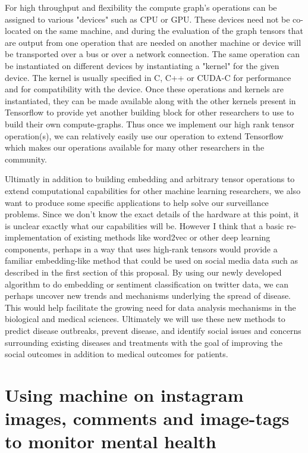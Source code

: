 For high throughput and flexibility the compute graph's operations can be assigned to various "devices" such as CPU or GPU. These devices need not be co-located on the same machine, and during the evaluation of the graph tensors that are output from one operation that are needed on another machine or device will be transported over a bus or over a network connection. The same operation can be instantiated on different devices by instantiating a "kernel" for the given device. The kernel is usually specified in C, C++ or CUDA-C for performance and for compatibility with the device. Once these operations and kernels are instantiated, they can be made available along with the other kernels present in Tensorflow to provide yet another building block for other researchers to use to build their own compute-graphs. Thus once we implement our high rank tensor operation(s), we can relatively easily use our operation to extend Tensorflow which makes our operations available for many other researchers in the community.

Ultimatly in addition to building embedding and arbitrary tensor operations to extend computational capabilities for other machine learning researchers, we also want to produce some specific applications to help solve our surveillance problems. Since we don't know the exact details of the hardware at this point, it is unclear exactly what our capabilities will be. However I think that a basic re-implementation of existing methods like word2vec or other deep learning components, perhaps in a way that uses high-rank tensors would provide a familiar embedding-like method that could be used on social media data such as described in the first section of this proposal. By using our newly developed algorithm to do embedding or sentiment classification on twitter data, we can perhaps uncover new trends and mechanisms underlying the spread of disease. This would help facilitate the growing need for data analysis mechanisms in the biological and medical sciences\cite{cichocki2014era}. Ultimately we will use these new methods to predict disease outbreaks, prevent disease, and identify social issues and concerns surrounding existing diseases and treatments with the goal of improving the social outcomes in addition to medical outcomes for patients.


\section{Using machine on instagram images, comments and image-tags to monitor mental health}

